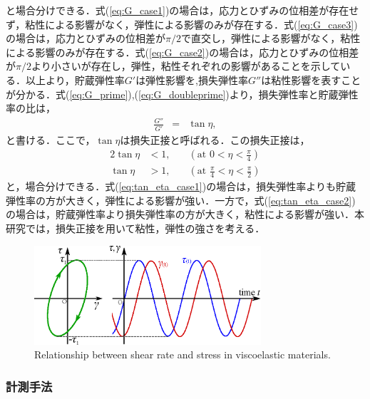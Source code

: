 と場合分けできる．式(\ref{eq:G_case1})の場合は，応力とひずみの位相差が存在せず，粘性による影響がなく，弾性による影響のみが存在する．式(\ref{eq:G_case3})の場合は，応力とひずみの位相差が$\pi/2$で直交し，弾性による影響がなく，粘性による影響のみが存在する．式(\ref{eq:G_case2})の場合は，応力とひずみの位相差が$\pi/2$より小さいが存在し，弾性，粘性それぞれの影響があることを示している．以上より，貯蔵弾性率$G'$は弾性影響を,損失弾性率$G''$は粘性影響を表すことが分かる．式(\ref{eq:G_prime}),(\ref{eq:G_doubleprime})より，損失弾性率と貯蔵弾性率の比は，
\begin{eqnarray}
    \frac{G''}{G'} &=& \tan\eta ,
    \label{eq:loss_factor}
\end{eqnarray}
と書ける．ここで，$\tan\eta$は損失正接と呼ばれる\cite{生物レオロジー}\cite{化学者のためのレオロジー}．この損失正接は，
\begin{alignat}{2}
    \tan\eta & < 1, & \quad \left(\text{at } 0<\eta<\frac{\pi}{4}\right)     \label{eq:tan_eta_case1}         \\
    \tan\eta & > 1, & \quad \left(\text{at } \frac{\pi}{4}<\eta<\frac{\pi}{2}\right) \label{eq:tan_eta_case2}
\end{alignat}
と，場合分けできる．式(\ref{eq:tan_eta_case1})の場合は，損失弾性率よりも貯蔵弾性率の方が大きく，弾性による影響が強い．一方で，式(\ref{eq:tan_eta_case2})の場合は，貯蔵弾性率より損失弾性率の方が大きく，粘性による影響が強い．本研究では，損失正接を用いて粘性，弾性の強さを考える．

\begin{figure}[ht]
    \centering
    \includegraphics[width=0.75\textwidth]{2-Methods/elasticity.eps}
    \caption{Relationship between shear rate and stress in viscoelastic materials.}
    \label{fig:elastic}
\end{figure}

\newpage

\subsubsection{計測手法}

